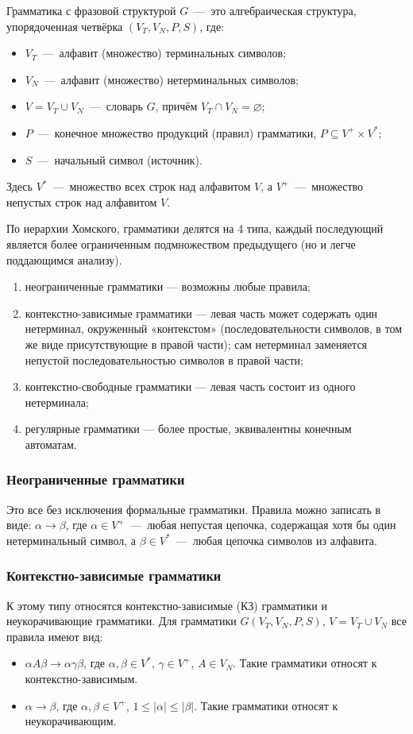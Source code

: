 Грамматика с фразовой структурой $G$~---~это алгебраическая структура, упорядоченная четвёрка $(V_T, V_N, P, S)$, где:
\begin{itemize}
	\item $V_T$~---~алфавит (множество) терминальных символов;
	\item $V_N$~---~алфавит (множество) нетерминальных символов;
	\item $V = V_T \cup V_N$~---~словарь $G$, причём $V_T \cap V_N = \varnothing$;
	\item $P$~---~конечное множество продукций (правил) грамматики, $P \subseteq V^+ \times V^*$;
	\item $S$~---~начальный символ (источник).
\end{itemize}

Здесь $V^{*}$~---~множество всех строк над алфавитом $V$, а $V^{+}$~---~множество непустых строк над алфавитом $V$.

По иерархии Хомского, грамматики делятся на 4 типа, каждый последующий является более ограниченным подмножеством предыдущего (но и легче поддающимся анализу).
\begin{enumerate}
	\item неограниченные грамматики — возможны любые правила;
	\item контекстно-зависимые грамматики — левая часть может содержать один нетерминал, окруженный «контекстом» (последовательности символов, в том же виде присутствующие в правой части); сам нетерминал заменяется непустой последовательностью символов в правой части;
	\item контекстно-свободные грамматики — левая часть состоит из одного нетерминала;
	\item регулярные грамматики — более простые, эквивалентны конечным автоматам.
\end{enumerate}

\subsubsection{Неограниченные грамматики}
Это все без исключения формальные грамматики. Правила можно записать в виде: $\alpha \rightarrow \beta$, 
где $\alpha \in V^{+}$~---~любая непустая цепочка, содержащая хотя бы один нетерминальный символ, 
а $\beta \in V^{*}$~---~любая цепочка символов из алфавита.

\subsubsection{Контекстно-зависимые грамматики}
К этому типу относятся контекстно-зависимые (КЗ) грамматики и неукорачивающие грамматики. Для грамматики 
$G(V_{T},V_{N},P,S)$, $V=V_{T}\cup V_{N}$ все правила имеют вид:
\begin{itemize}
	\item $\alpha A\beta \rightarrow \alpha \gamma \beta$, где $\alpha ,\beta \in V^{*}$, $\gamma \in V^{+}$, $A\in V_{N}$. Такие грамматики относят к контекстно-зависимым.
	\item $\alpha \rightarrow \beta$, где $\alpha ,\beta \in V^{+}$, $1\leq |\alpha |\leq |\beta |$. Такие грамматики относят к неукорачивающим.
\end{itemize}


